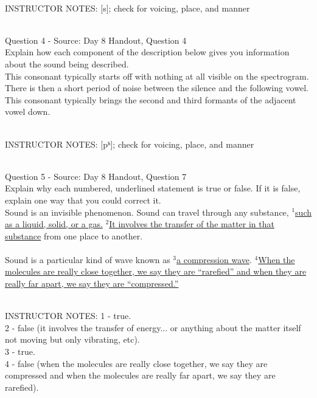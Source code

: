 \documentclass[12pt]{article}
\begin{document}
~\\
INSTRUCTOR NOTES: [s]; check for voicing, place, and manner


~\\

{\large Question 4} - Source: Day 8 Handout, Question 4\\

Explain how each component of the description below gives you information about the sound being described.\\

This consonant typically starts off with nothing at all visible on the spectrogram. There is then a short period of noise between the silence and the following vowel. This consonant typically brings the second and third formants of the adjacent vowel down.


~\\
INSTRUCTOR NOTES: [pʰ]; check for voicing, place, and manner


~\\

{\large Question 5} - Source: Day 8 Handout, Question 7\\

Explain why each numbered, underlined statement is true or false. If it is false, explain one way that you could correct it.\\

Sound is an invisible phenomenon. Sound can travel through any substance, $^1$\ul{such as a liquid, solid, or a gas.} $^2$\ul{It involves the transfer of the matter in that substance} from one place to another.\\\\Sound is a particular kind of wave known as $^3$\ul{a compression wave}. $^4$\ul{When the molecules are really close together, we say they are ``rarefied'' and when they are really far apart, we say they are ``compressed.''}


~\\
INSTRUCTOR NOTES: 1 - true.\\2 - false (it involves the transfer of energy... or anything about the matter itself not moving but only vibrating, etc). \\3 - true.\\4 - false (when the molecules are really close together, we say they are compressed and when the molecules are really far apart, we say they are rarefied).


~\\
\end{document}
